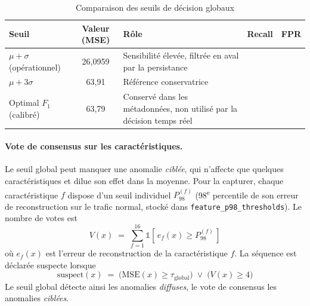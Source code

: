 \begin{table}[H]
\centering
\caption{Comparaison des seuils de décision globaux}
\label{tab:comp-seuils}
\small
\begin{tabularx}{\textwidth}{@{}>{\raggedright\arraybackslash}lcXcc@{}}
\toprule
\textbf{Seuil} & \textbf{Valeur (MSE)} & \textbf{Rôle} & \textbf{Recall} & \textbf{FPR} \\
\midrule
$\mu+\sigma$ (opérationnel) & 26{,}0959 & Sensibilité élevée, filtrée en aval par la persistance & \A{} & \A{} \\
$\mu+3\sigma$ & 63{,}91 & Référence conservatrice & \A{} & \A{} \\
Optimal $F_1$ (calibré) & 63{,}79 & Conservé dans les métadonnées, non utilisé par la décision temps réel & \A{} & \A{} \\
\bottomrule
\end{tabularx}
\end{table}


\paragraph{Vote de consensus sur les caractéristiques.} Le seuil global peut manquer une anomalie \emph{ciblée}, qui n'affecte que quelques caractéristiques et dilue son effet dans la moyenne. Pour la capturer, chaque caractéristique $f$ dispose d'un seuil individuel $P_{98}^{(f)}$ (98\textsuperscript{e} percentile de son erreur de reconstruction sur le trafic normal, stocké dans \texttt{feature\_p98\_thresholds}). Le nombre de votes est
\begin{equation}
V(x) \;=\; \sum_{f=1}^{16} \mathbb{1}\!\left[\,e_f(x) \ge P_{98}^{(f)}\,\right]
\label{eq:votes}
\end{equation}
où $e_f(x)$ est l'erreur de reconstruction de la caractéristique $f$. La séquence est déclarée suspecte lorsque
\begin{equation}
\text{suspect}(x) \;=\; \big(\mathrm{MSE}(x) \ge \tau_{\text{global}}\big)\;\lor\;\big(V(x) \ge 4\big)
\label{eq:orgate}
\end{equation}
Le seuil global détecte ainsi les anomalies \emph{diffuses}, le vote de consensus les anomalies \emph{ciblées}.


